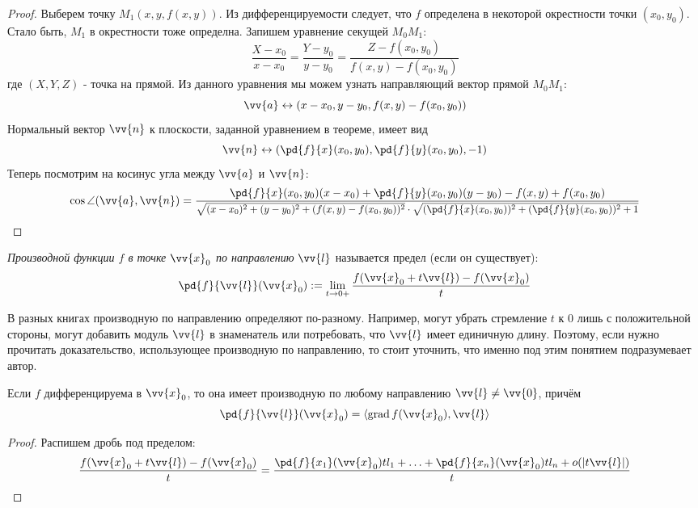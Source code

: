 \begin{proof}
	Выберем точку $M_1(x, y, f(x, y))$. Из дифференцируемости следует, что $f$ определена в некоторой окрестности точки $(x_0, y_0)$. Стало быть, $M_1$ в окрестности тоже определна. Запишем уравнение секущей $M_0 M_1$:
	\[
		\frac{X - x_0}{x - x_0} = \frac{Y - y_0}{y - y_0} = \frac{Z - f(x_0, y_0)}{f(x, y) - f(x_0, y_0)}
	\]
	где $(X, Y, Z)$ - точка на прямой. Из данного уравнения мы можем узнать направляющий вектор прямой $M_0 M_1$:
	\[
		\vv{a} \leftrightarrow (x - x_0, y - y_0, f(x, y) - f(x_0, y_0))
	\]
	Нормальный вектор $\vv{n}$ к плоскости, заданной уравнением в теореме, имеет вид
	\[
		\vv{n} \leftrightarrow \left(\pd{f}{x} (x_0, y_0), \pd{f}{y} (x_0, y_0), -1\right)
	\]
	Теперь посмотрим на косинус угла между $\vv{a}$ и $\vv{n}$:
	\[
		\cos \angle (\vv{a}, \vv{n}) = \frac{\pd{f}{x} (x_0, y_0)(x - x_0) + \pd{f}{y} (x_0, y_0)(y - y_0) - f(x, y) + f(x_0, y_0)}{\scalebox{0.9}{$\sqrt{(x - x_0)^2 + (y - y_0)^2 + (f(x, y) - f(x_0, y_0))^2} \cdot \sqrt{(\pd{f}{x} (x_0, y_0))^2 + (\pd{f}{y} (x_0, y_0))^2 + 1}$}}
	\]
\end{proof}

\begin{definition}
	\textit{Производной функции $f$ в точке $\vv{x}_0$ по направлению} $\vv{l}$ называется предел (если он существует):
	\[
		\pd{f}{\vv{l}} (\vv{x}_0) := \liml_{t \to 0+} \frac{f(\vv{x}_0 + t\vv{l}) - f(\vv{x}_0)}{t}
	\]
\end{definition}

\begin{note}
	В разных книгах производную по направлению определяют по-разному. Например, могут убрать стремление $t$ к 0 лишь с положительной стороны, могут добавить модуль $\vv{l}$ в знаменатель или потребовать, что $\vv{l}$ имеет единичную длину. Поэтому, если нужно прочитать доказательство, использующее производную по направлению, то стоит уточнить, что именно под этим понятием подразумевает автор.
\end{note}

\begin{proposition}
	Если $f$ дифференцируема в $\vv{x}_0$, то она имеет производную по любому направлению $\vv{l} \neq \vv{0}$, причём
	\[
		\pd{f}{\vv{l}} (\vv{x}_0) = \trbr{\grad f(\vv{x}_0), \vv{l}}
	\]
\end{proposition}

\begin{proof}
	Распишем дробь под пределом:
	\[
		\frac{f(\vv{x}_0 + t\vv{l}) - f(\vv{x}_0)}{t} = \frac{\pd{f}{x_1} (\vv{x}_0) tl_1 + \ldots + \pd{f}{x_n} (\vv{x}_0)tl_n + o(|t\vv{l}|)}{t}
	\]
\end{proof}

